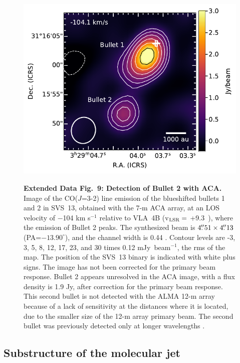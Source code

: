 \documentclass[12pt]{mythesis}
\begin{document}
\begin{figure}[p!]
\begin{center}
\includegraphics[width=\textwidth]{figures/bullet2aca.pdf} \\
\caption[Extended Data Fig.\ 9: Detection of Bullet 2 with ACA]{{\bf Extended Data Fig.\ 9: Detection of Bullet 2 with ACA.}
Image of the CO($J$=3-2) line emission of the blueshifted bullets 1 and 2 in SVS~13, obtained with the 7-m ACA array, at an LOS velocity of $-$104 km s$^{-1}$ relative to VLA~4B (v$_{\rm LSR}=$ +9.3~\kms)\cite{diaz-rodriguez2022}, where the emission of Bullet 2 peaks. The synthesized beam is $4\mbox{$.\!\!^{\prime\prime}$}51\times 4\mbox{$.\!\!^{\prime\prime}$}13$ (PA=$-13.90^\circ$), and the channel width is 0.44 \kms. Contour levels are -3, 3, 5, 8, 12, 17, 23, and 30 times 0.12 mJy~beam$^{-1}$, the rms of the map. The position of the SVS~13 binary is indicated with white plus signs. The image has not been corrected for the primary beam response. Bullet 2 appears unresolved in the ACA image, with a flux density is 1.9 Jy, after correction for the primary beam response. This second bullet is not detected with the ALMA 12-m array because of a lack of sensitivity at the distances where it is located, due to the smaller size of the 12-m array primary beam. The second bullet was previously detected only at longer wavelengths \cite{bachiller2000,chen2016,lefevre2017}. 
\label{fig:bullet2aca}
}
\end{center}
\end{figure}


\subsection{Substructure of the molecular jet}
\end{document}
